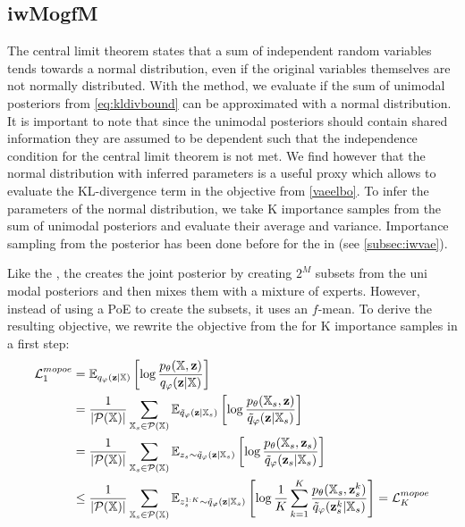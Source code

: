 \subsection{iwMogfM} \label{subsubsec:iwMogfM}
The central limit theorem states that a sum of independent random variables tends towards a normal distribution, even if the original variables themselves are not normally distributed.
With the  method, we evaluate if the sum of unimodal posteriors from \cref{eq:kldivbound} can be approximated with a normal distribution.
It is important to note that since the unimodal posteriors should contain shared information they are assumed to be dependent such that the independence condition for the central limit theorem is not met.
We find however that the normal distribution with inferred parameters is a useful proxy which allows to evaluate the KL-divergence term in the objective from \cref{vaeelbo}.
To infer the parameters of the normal distribution, we take K importance samples from the sum of unimodal posteriors and evaluate their average and variance.
Importance sampling from the posterior has been done before for the  in \cite{burda_importance_2016} (see \cref{subsec:iwvae}).

Like the , the  creates the joint posterior by creating $2^M$ subsets from the uni modal posteriors and then mixes them with a mixture of experts.
However, instead of using a PoE to create the subsets, it uses an $f$-mean.
To derive the resulting objective, we rewrite the objective from the  for K importance samples in a first step:
\begin{equation}
    \begin{split}
        \mathcal{L}^{mopoe}_1 &= \mathbb{E}_{q_{\varphi}(\textbf{z}|\mathbb{X})} \left[ \log \frac{p_{\theta}(\mathbb{X}, \textbf{z})}{q_{\varphi}(\textbf{z}|\mathbb{X})} \right]\\
        &=\frac{1}{|\mathcal{P}(\mathbb{X})|} \sum _{\mathbb{X}_s \in \mathcal{P}(\mathbb{X})} \mathbb{E}_{\tilde{q}_{\varphi}(\textbf{z}|\mathbb{X}_s)} \left[ \log \frac{p_{\theta}(\mathbb{X}_s, \textbf{z})}{\tilde{q}_{\varphi}(\textbf{z}|\mathbb{X}_s)} \right]\\
        &=\frac{1}{|\mathcal{P}(\mathbb{X})|} \sum _{\mathbb{X}_s \in \mathcal{P}(\mathbb{X})} \mathbb{E}_{z_s \sim \tilde{q}_{\varphi}(\textbf{z}|\mathbb{X}_s)} \left[ \log \frac{p_{\theta}(\mathbb{X}_s, \textbf{z}_s)}{\tilde{q}_{\varphi}(\textbf{z}_s|\mathbb{X}_s)} \right]\\
        &\leq \frac{1}{|\mathcal{P}(\mathbb{X})|} \sum _{\mathbb{X}_s \in \mathcal{P}(\mathbb{X})} \mathbb{E}_{z^{1:K}_s \sim \tilde{q}_{\varphi}(\textbf{z}|\mathbb{X}_s)} \left[ \log \frac{1}{K} \sum _{k=1}^K \frac{p_{\theta}(\mathbb{X}_s, \textbf{z}^k _s)}{\tilde{q}_{\varphi}(\textbf{z}^k _s|\mathbb{X}_s)} \right] = \mathcal{L}^{mopoe}_K
    \end{split}
\end{equation}

